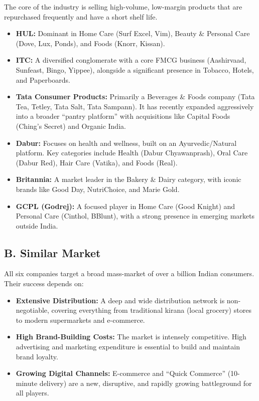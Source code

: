 \documentclass[12pt, a4paper]{report}
\begin{document}
The core of the industry is selling high-volume, low-margin products that are repurchased frequently and have a short shelf life.

\begin{itemize}
    \item \textbf{HUL:} Dominant in Home Care (Surf Excel, Vim), Beauty \& Personal Care (Dove, Lux, Ponds), and Foods (Knorr, Kissan).
    
    \item \textbf{ITC:} A diversified conglomerate with a core FMCG business (Aashirvaad, Sunfeast, Bingo, Yippee), alongside a significant presence in Tobacco, Hotels, and Paperboards.
    
    \item \textbf{Tata Consumer Products:} Primarily a Beverages \& Foods company (Tata Tea, Tetley, Tata Salt, Tata Sampann). It has recently expanded aggressively into a broader ``pantry platform'' with acquisitions like Capital Foods (Ching's Secret) and Organic India.
    
    \item \textbf{Dabur:} Focuses on health and wellness, built on an Ayurvedic/Natural platform. Key categories include Health (Dabur Chyawanprash), Oral Care (Dabur Red), Hair Care (Vatika), and Foods (Real).
    
    \item \textbf{Britannia:} A market leader in the Bakery \& Dairy category, with iconic brands like Good Day, NutriChoice, and Marie Gold.
    
    \item \textbf{GCPL (Godrej):} A focused player in Home Care (Good Knight) and Personal Care (Cinthol, BBlunt), with a strong presence in emerging markets outside India.
\end{itemize}

\subsection{B. Similar Market}

All six companies target a broad mass-market of over a billion Indian consumers. Their success depends on:

\begin{itemize}
    \item \textbf{Extensive Distribution:} A deep and wide distribution network is non-negotiable, covering everything from traditional kirana (local grocery) stores to modern supermarkets and e-commerce.
    
    \item \textbf{High Brand-Building Costs:} The market is intensely competitive. High advertising and marketing expenditure is essential to build and maintain brand loyalty.
    
    \item \textbf{Growing Digital Channels:} E-commerce and ``Quick Commerce'' (10-minute delivery) are a new, disruptive, and rapidly growing battleground for all players.
\end{itemize}
\end{document}
